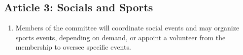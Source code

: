 \subsection{Article 3: Socials and Sports}
\begin{enumerate}
\item Members of the committee will coordinate social events and may organize sports events, depending on demand, or appoint a volunteer from the membership to oversee specific events.
\end{enumerate}